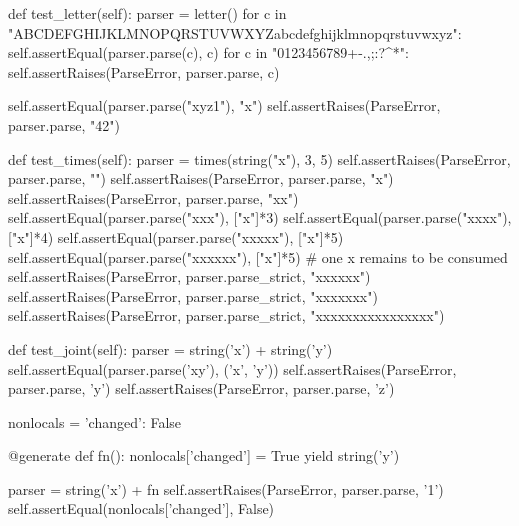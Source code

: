 
\begin{python}
def test_letter(self):
    parser = letter()
    for c in "ABCDEFGHIJKLMNOPQRSTUVWXYZabcdefghijklmnopqrstuvwxyz":
        self.assertEqual(parser.parse(c), c)
    for c in "0123456789+-.,;:?^*":
        self.assertRaises(ParseError, parser.parse, c)

    self.assertEqual(parser.parse("xyz1"), "x")
    self.assertRaises(ParseError, parser.parse, "42")
\end{python}

\begin{python}
def test_times(self):
    parser = times(string("x"), 3, 5)
    self.assertRaises(ParseError, parser.parse, "")
    self.assertRaises(ParseError, parser.parse, "x")
    self.assertRaises(ParseError, parser.parse, "xx")
    self.assertEqual(parser.parse("xxx"), ["x"]*3)
    self.assertEqual(parser.parse("xxxx"), ["x"]*4)
    self.assertEqual(parser.parse("xxxxx"), ["x"]*5)
    self.assertEqual(parser.parse("xxxxxx"), ["x"]*5) # one x remains to be consumed
    self.assertRaises(ParseError, parser.parse_strict, "xxxxxx")
    self.assertRaises(ParseError, parser.parse_strict, "xxxxxxx")
    self.assertRaises(ParseError, parser.parse_strict, "xxxxxxxxxxxxxxxx")
\end{python}



\begin{python}
def test_joint(self):
    parser = string('x') + string('y')
    self.assertEqual(parser.parse('xy'), ('x', 'y'))
    self.assertRaises(ParseError, parser.parse, 'y')
    self.assertRaises(ParseError, parser.parse, 'z')

    nonlocals = {'changed': False}

    @generate
    def fn():
        nonlocals['changed'] = True
        yield string('y')

    parser = string('x') + fn
    self.assertRaises(ParseError, parser.parse, '1')
    self.assertEqual(nonlocals['changed'], False)
\end{python}






